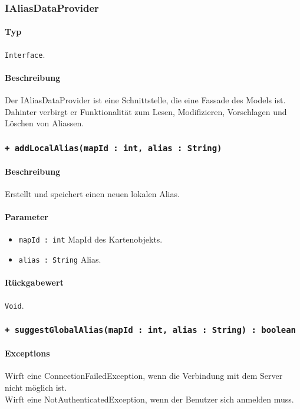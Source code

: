 \subsubsection{IAliasDataProvider}\label{App_AddAlias_IAliasDataProvider}
\paragraph*{Typ}
\texttt{Interface}.
\paragraph*{Beschreibung}
Der IAliasDataProvider ist eine Schnittstelle, die eine Fassade des Models ist. 
Dahinter verbirgt er Funktionalität zum Lesen, Modifizieren, Vorschlagen und Löschen von Aliassen.

\subsubsection*{\texttt{+ addLocalAlias(mapId : int, alias : String)}}\label{App_AddAlias_IAliasDataProvider_addLocalAlias}%
\paragraph*{Beschreibung}
Erstellt und speichert einen neuen lokalen Alias.
\paragraph*{Parameter}
\begin{itemize}
    \item \texttt{mapId : int} MapId des Kartenobjekts.
    \item \texttt{alias : String} Alias.
\end{itemize}
\paragraph*{Rückgabewert}
\texttt{Void}.

\subsubsection*{\texttt{+ suggestGlobalAlias(mapId : int, alias : String) : boolean}}\label{App_AddAlias_IAliasDataProvider_suggestGlobalAlias}%
\paragraph*{Exceptions}
Wirft eine ConnectionFailedException, wenn die Verbindung mit dem Server nicht möglich ist.\\
Wirft eine NotAuthenticatedException, wenn der Benutzer sich anmelden muss.

